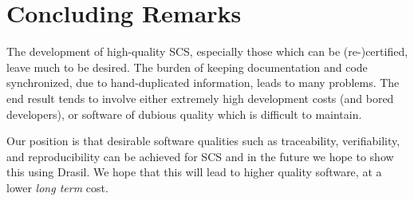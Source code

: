 \documentclass{sig-alternate-05-2015}
\newcommand{\lss}{Drasil}
\begin{document}
\section{Concluding Remarks} \label{sec:conclusion}

The development of high-quality SCS, especially those which can be
(re-)certified, leave much to be desired.  The burden of keeping documentation
and code synchronized, due to hand-duplicated information, leads to many 
problems.  The end result tends to involve either extremely high development
costs (and bored developers), or software of dubious quality which is 
difficult to maintain.

Our position is that desirable software qualities such as
traceability, verifiability, and reproducibility can be achieved for SCS and in the future we hope to show this using \lss{}.
We hope that this will lead to higher quality software, at a lower
\emph{long term} cost.


  
\end{document}
